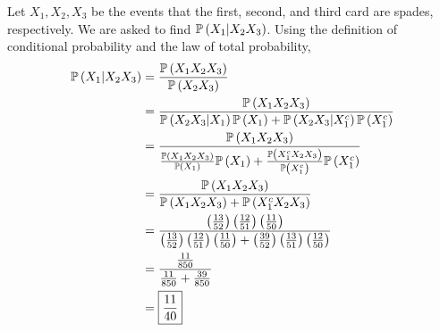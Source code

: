 \documentclass{article}
\begin{document}
Let $X_1, X_2, X_3$ be the events that the first, second, and third card are spades, respectively.
We are asked to find $\mathbb{P} \left ( X_1 \vert X_2 X_3 \right)$.
Using the definition of conditional probability and the law of total probability,
\begin{align*}
  \mathbb{P} \left ( X_1 \vert X_2 X_3 \right) &= \frac{\mathbb{P} \left ( X_1 X_2 X_3 \right)}{\mathbb{P} \left ( X_2 X_3  \right)} \\
                         &= \frac{\mathbb{P} \left ( X_1 X_2 X_3 \right)}{\mathbb{P} \left ( X_2 X_3 \vert X_1 \right) \mathbb{P} \left ( X_1 \right) + \mathbb{P} \left ( X_2 X_3 \vert X_1^c \right) \mathbb{P} \left ( X_1^c \right)} \\
                         &= \frac{\mathbb{P} \left ( X_1 X_2 X_3 \right)}{\frac{\mathbb{P} \left ( X_1 X_2 X_3 \right)}{\mathbb{P} \left ( X_1 \right)} \mathbb{P} \left ( X_1 \right) + \frac{\mathbb{P} \left ( X_1^c X_2 X_3 \right)}{\mathbb{P} \left ( X_1^c \right)} \mathbb{P} \left ( X_1^c \right) } \\
                         &= \frac{\mathbb{P} \left ( X_1 X_2 X_3 \right)}{\mathbb{P} \left ( X_1 X_2 X_3 \right) + \mathbb{P} \left ( X_1^c X_2 X_3 \right)} \\
                         &= \frac{\left (\frac{13}{52} \right) \left (\frac{12}{51} \right) \left (\frac{11}{50} \right)}{\left (\frac{13}{52} \right) \left (\frac{12}{51} \right) \left (\frac{11}{50} \right) + \left (\frac{39}{52} \right) \left (\frac{13}{51} \right) \left (\frac{12}{50} \right)} \\
                         &= \frac{\frac{11}{850}}{\frac{11}{850} + \frac{39}{850}} \\
                         &= \boxed{\frac{11}{40}} \\
\end{align*}
\end{document}
